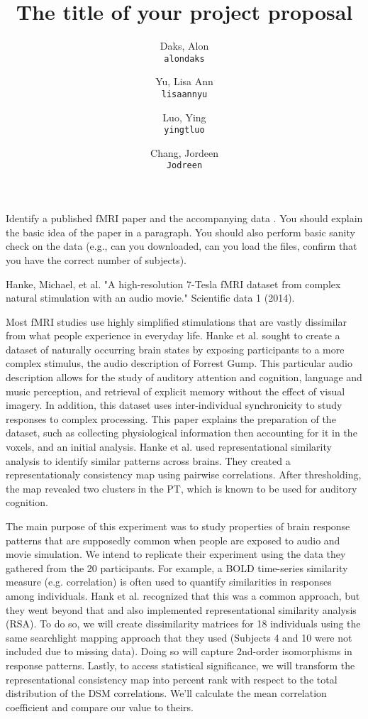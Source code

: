 \documentclass[11pt]{article}
\title{The title of your project proposal}
\author{
  Daks, Alon\\
  \texttt{alondaks}
  \and
  Yu, Lisa Ann\\
  \texttt{lisaannyu}
  \and
  Luo, Ying\\
  \texttt{yingtluo}
  \and
  Chang, Jordeen\\
  \texttt{Jodreen}
}
\begin{document}
\maketitle

Identify a published fMRI paper and the accompanying data
\cite{lindquist2008statistical}.  You should explain the basic idea of the
paper in a paragraph.  You should also perform basic sanity check on the data
(e.g., can you downloaded, can you load the files, confirm that you have the
correct number of subjects).

Hanke, Michael, et al. "A high-resolution 7-Tesla fMRI dataset from complex 
natural stimulation with an audio movie." Scientific data 1 (2014).

Most fMRI studies use highly simplified stimulations that are vastly dissimilar
from what people experience in everyday life.  Hanke et al. sought to create a
dataset of naturally occurring brain states by exposing participants to a 
more complex stimulus, the audio description of Forrest Gump.  This particular
audio description allows for the study of auditory attention and cognition, 
language and music perception, and retrieval of explicit memory without the
effect of visual imagery.  In addition, this dataset uses inter-individual 
synchronicity to study responses to complex processing.  This paper explains
the preparation of the dataset, such as collecting physiological information
then accounting for it in the voxels, and an initial analysis.  Hanke et al.
used representational similarity analysis to identify similar patterns
across brains.  They created a representationaly consistency map using pairwise
correlations.  After thresholding, the map revealed two clusters in the PT,
which is known to be used for auditory cognition.

The main purpose of this experiment was to study properties of brain response
patterns that are supposedly common when people are exposed to audio and movie
simulation. We intend to replicate their experiment using the data they gathered
from the 20 participants. For example, a BOLD time-series similarity measure
(e.g. correlation) is often used to quantify similarities in responses among
individuals. Hank et al. recognized that this was a common approach, but they
went beyond that and also implemented representational similarity analysis (RSA).
To do so, we will create dissimilarity matrices for 18 individuals using the same
searchlight mapping approach that they used (Subjects 4 and 10 were not included
due to missing data). Doing so will capture 2nd-order isomorphisms in response
patterns. Lastly, to access statistical significance, we will transform the
representational consistency map into percent rank with respect to the total
distribution of the DSM correlations. We'll calculate the mean correlation
coefficient and compare our value to theirs.




\end{document}
